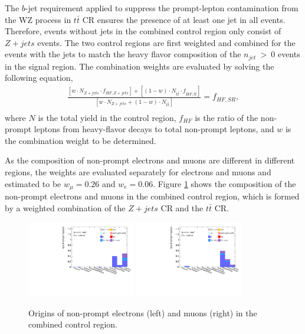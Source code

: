 The $b$-jet requirement applied to suppress the prompt-lepton contamination from the WZ process in $t\bar{t}$ CR ensures the presence of at least one jet in all events. Therefore, events without jets in the combined control region only consist of $Z+jets$ events. The two control regions are first weighted and combined for the events with the jets to match the heavy flavor composition of the $n_{jet}~>~0$ events in the signal region. The combination weights are evaluated by solving the following equation,
\begin{equation}
\begin{aligned}
\frac{[w \cdot N_{Z+jets} \cdot f_{HF, Z+jets}] + [(1-w) \cdot N_{t\bar{t}} \cdot f_{HF, t\bar{t}} ]} {[w \cdot N_{Z+jets} + (1-w) \cdot N_{t\bar{t}}]} = f_{HF, SR},\\
\end{aligned}
\end{equation}
where $N$ is the total yield in the control region, $ f_{HF}$ is the ratio of the non-prompt leptons from heavy-flavor decays to total non-prompt leptons, and $w$ is the combination weight to be determined.

As the composition of non-prompt electrons and muons are different in different regions, the weights are evaluated separately for electrons and muons and estimated to be $w_{\mu} = 0.26$ and $w_{e} = 0.06$. Figure \ref{fig:NonPromptCombined} shows the composition of the non-prompt electrons and muons in the combined control region, which is formed by a weighted combination of the $Z+jets$ CR and the $t\bar{t}$ CR.

\begin{figure}[!htbp]
    \centering
    \includegraphics[width = 0.42\textwidth]{figures/Analysis/Background/NonPromptComposition_Combined_Electrons.pdf}
    \includegraphics[width = 0.42\textwidth]{figures/Analysis/Background/NonPromptComposition_Combined_Muons.pdf}
    \caption{ Origins of non-prompt electrons (left) and muons (right) in the combined control region. \label{fig:NonPromptCombined}}
\end{figure}

